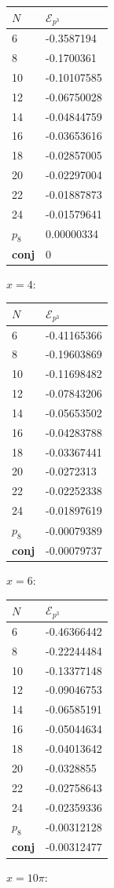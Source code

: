 \documentclass[a4paper,10pt]{article}
\begin{document}
\begin{table}[h]
\begin{minipage}{0.25\linewidth}
\begin{tabular}{ll}
$N$ & $\mathcal{E}_{p^3}$ \\
\hline
6 & -0.3587194 \\
8 & -0.1700361 \\
10 & -0.10107585 \\
12 & -0.06750028 \\
14 & -0.04844759 \\
16 & -0.03653616 \\
18 & -0.02857005 \\
20 & -0.02297004 \\
22 & -0.01887873 \\
24 & -0.01579641 \\
$p_8$ & \phantom{-}0.00000334\\
\bf{conj} &  \phantom{-}0\\
\hline
\end{tabular}
\end{minipage}%
\begin{minipage}{0.25\linewidth}
$x=4:$

\begin{tabular}{ll}
$N$ & $\mathcal{E}_{p^3}$ \\
\hline
6 & -0.41165366 \\
8 & -0.19603869 \\
10 & -0.11698482 \\
12 & -0.07843206 \\
14 & -0.05653502 \\
16 & -0.04283788 \\
18 & -0.03367441 \\
20 & -0.0272313 \\
22 & -0.02252338 \\
24 & -0.01897619 \\
$p_8$ & -0.00079389 \\
\bf{conj} &  -0.00079737 \\
\hline
\end{tabular}
\end{minipage}%
\begin{minipage}{0.25\linewidth}
$x=6$: 


\begin{tabular}{ll}
$N$ & $\mathcal{E}_{p^3}$ \\
\hline
6 & -0.46366442 \\
8 & -0.22244484 \\
10 & -0.13377148 \\
12 & -0.09046753 \\
14 & -0.06585191 \\
16 & -0.05044634 \\
18 & -0.04013642 \\
20 & -0.0328855 \\
22 & -0.02758643 \\
24 & -0.02359336 \\
$p_8$ & -0.00312128 \\
\bf{conj} & -0.00312477\\
\hline
\end{tabular}
\end{minipage}%
\begin{minipage}{0.25\linewidth}
$x=10 \pi:$


\end{minipage}
\end{table}
\end{document}
